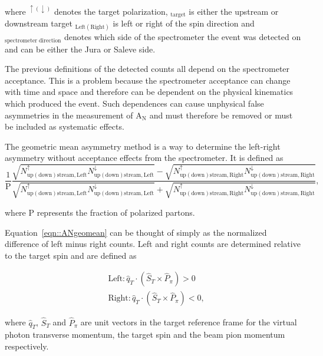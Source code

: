 \noindent
where $^{\uparrow(\downarrow)}$ denotes the target polarization,
$_{\mathrm{target}}$ is either the upstream or downstream target
$_{\mathrm{Left(Right)}}$ is left or right of the spin direction and
${_\mathrm{spectrometer \; direction}}$ denotes which side of the spectrometer
the event was detected on and can be either the Jura or Saleve side.

The previous definitions of the detected counts all depend on the spectrometer
acceptance.  This is a problem because the spectrometer acceptance can change
with time and space and therefore can be dependent on the physical kinematics
which produced the event.  Such dependences can cause unphysical false
asymmetries in the measurement of A$_{\mathrm{N}}$ and must therefore be removed
or must be included as systematic effects.

The geometric mean asymmetry method is a way to determine the left-right
asymmetry without acceptance effects from the spectrometer.  It is defined as
\begin{equation}
  \label{eqn::ANgeomean}
  \frac{1}{\mathrm{P}}\frac{\sqrt{N_{\mathrm{up(down)stream,
          Left}}^{\uparrow}N_{\mathrm{up(down)stream, Left}}^{\downarrow}} -
    \sqrt{N_{\mathrm{up(down)stream, Right}}^{\uparrow}N_{\mathrm{up(down)stream,
          Right}}^{\downarrow}} }{\sqrt{N_{\mathrm{up(down)stream,
          Left}}^{\uparrow}N_{\mathrm{up(down)stream, Left}}^{\downarrow}} +
    \sqrt{N_{\mathrm{up(down)stream, Right}}^{\uparrow}N_{\mathrm{up(down)stream,
          Right}}^{\downarrow}} },
\end{equation}

\noindent
where P represents the fraction of polarized partons.

Equation~\ref{eqn::ANgeomean} can be thought of simply as the normalized
difference of left minus right counts.  Left and right counts are determined
relative to the target spin and are defined as

\begin{equation}
  \label{equ::Defleftright}
  \begin{aligned}
    &\text{Left}: \hat{q}_T \cdot (\hat{S}_T \times \hat{P}_{\pi}) > 0 \\
    &\text{Right}: \hat{q}_T \cdot (\hat{S}_T \times \hat{P}_{\pi}) < 0, 
  \end{aligned}
\end{equation}

\noindent
where $\hat{q}_T$, $\hat{S}_T$ and $\hat{P}_{\pi}$ are unit vectors in the
target reference frame for the virtual photon transverse momentum, the target
spin and the beam pion momentum respectively.


